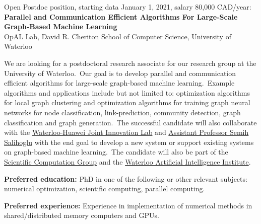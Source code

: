 \documentclass[12pt]{article}
\begin{document}
\begin{center}
{Open Postdoc position, starting data January 1, 2021, salary 80,000 CAD/year: \\\vspace{0.2cm} \bf Parallel and Communication Efficient Algorithms For Large-Scale Graph-Based Machine Learning} \\\vspace{0.2cm} {OpAL Lab, David R. Cheriton School of Computer Science, University of Waterloo}\\
\end{center}

We are looking for a postdoctoral research associate for our research group at the University of Waterloo.\ Our goal is to develop parallel and communication efficient algorithms for large-scale graph-based machine learning.\ 
Example algorithms and applications include but not limited to: optimization algorithms for local graph clustering and optimization algorithms for training graph neural networks for node classification, link-prediction, community detection, graph classification and graph generation.\
The successful candidate will also collaborate with the \href{https://www.huawei.com/ca/news/ca-en/20161111huawei-and-university-of-waterloo-partner-for-world-class-research-and-innovation}{Waterloo-Huawei Joint Innovation Lab}  and \href{https://cs.uwaterloo.ca/~ssalihog/}{Assistant Professor Semih Salihoglu} with the end goal to develop a new system or support existing systems on graph-based machine learning.\ The candidate will also be part of the \href{https://scicom.uwaterloo.ca}{Scientific Computation Group} and the \href{https://uwaterloo.ca/artificial-intelligence-institute/}{Waterloo Artificial Intelligence Institute}.\\\vspace{-0.3cm}

\noindent \textbf{Preferred education:} PhD in one of the following or other relevant subjects: numerical optimization, scientific computing, parallel computing.\\\vspace{-0.3cm}

\noindent \textbf{Preferred experience:} Experience in implementation of numerical methods in shared/distributed memory computers and GPUs. \\\vspace{-0.3cm}

\end{document}

